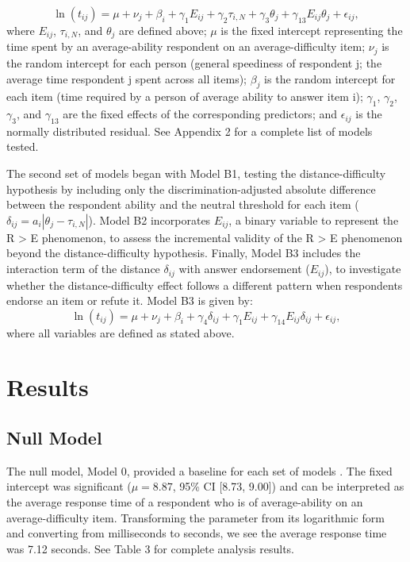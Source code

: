 \documentclass[
]{agujournal2019}
\begin{document}
\[\ln{(t_{ij})}=\mu + \nu_j +\beta_i+\gamma_1E_{ij}+\gamma_2\tau_{i,N}+\gamma_3\theta_j +\gamma_{13}E_{ij}\theta_j+\epsilon_{ij},\]
where \(E_{ij}\), \(\tau_{i,N}\), and \(\theta_j\) are defined above;
\(\mu\) is the fixed intercept representing the time spent by an
average-ability respondent on an average-difficulty item; \(\nu_j\) is
the random intercept for each person (general speediness of respondent
j; the average time respondent j spent across all items); \(\beta_j\) is
the random intercept for each item (time required by a person of average
ability to answer item i); \(\gamma_1\), \(\gamma_2\), \(\gamma_3\), and
\(\gamma_{13}\) are the fixed effects of the corresponding predictors;
and \(\epsilon_{ij}\) is the normally distributed residual. See Appendix
2 for a complete list of models tested.

The second set of models began with Model B1, testing the
distance-difficulty hypothesis by including only the
discrimination-adjusted absolute difference between the respondent
ability and the neutral threshold for each item
(\(\delta_{ij}=a_i |θ_j-τ_{i,N} |\)). Model B2 incorporates \(E_{ij}\),
a binary variable to represent the R \textgreater{} E phenomenon, to
assess the incremental validity of the R \textgreater{} E phenomenon
beyond the distance-difficulty hypothesis. Finally, Model B3 includes
the interaction term of the distance \(\delta_{ij}\) with answer
endorsement (\(E_{ij}\)), to investigate whether the distance-difficulty
effect follows a different pattern when respondents endorse an item or
refute it. Model B3 is given by:
\[\ln{(t_{ij})}=\mu+\nu_j+\beta_i+\gamma_4 \delta_{ij}+\gamma_1 E_{ij}+\gamma_{14} E_{ij}\delta_{ij}+\epsilon_{ij},\]
where all variables are defined as stated above.

\section{Results}\label{results}

\subsection{Null Model}\label{null-model}

The null model, Model 0, provided a baseline for each set of models .
The fixed intercept was significant (\(μ=8.87\), 95\% CI {[}8.73,
9.00{]}) and can be interpreted as the average response time of a
respondent who is of average-ability on an average-difficulty item.
Transforming the parameter from its logarithmic form and converting from
milliseconds to seconds, we see the average response time was 7.12
seconds. See Table 3 for complete analysis results.
\end{document}
